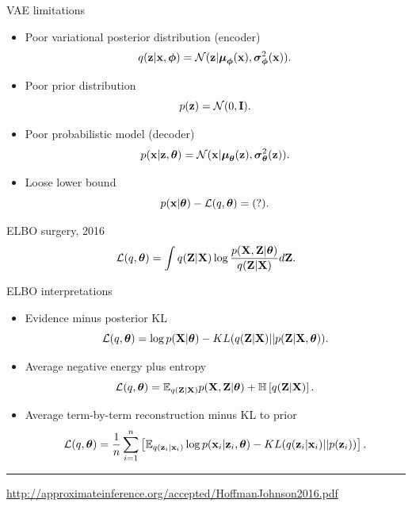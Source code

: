 \begin{frame}{VAE limitations}
\begin{itemize}
	\item Poor variational posterior distribution (encoder)
	\[
		q(\mathbf{z} | \mathbf{x}, \boldsymbol{\phi}) = \mathcal{N}(\mathbf{z}| \boldsymbol{\mu}_{\boldsymbol{\phi}}(\mathbf{x}), \boldsymbol{\sigma}^2_{\boldsymbol{\phi}}(\mathbf{x})).
	\]
	\item Poor prior distribution
	\[
		p(\mathbf{z}) = \mathcal{N}(0, \mathbf{I}).
	\]
	\item Poor probabilistic model (decoder)
	\[
		p(\mathbf{x} | \mathbf{z}, \boldsymbol{\theta}) = \mathcal{N}(\mathbf{x}| \boldsymbol{\mu}_{\boldsymbol{\theta}}(\mathbf{z}), \boldsymbol{\sigma}^2_{\boldsymbol{\theta}}(\mathbf{z})).
	\]
	\item Loose lower bound
	\[
		p(\mathbf{x} | \boldsymbol{\theta}) - \mathcal{L}(q, \boldsymbol{\theta}) = (?).
	\]
\end{itemize}
\end{frame}
\begin{frame}{ELBO surgery, 2016}
		\[
			\mathcal{L} (q, \boldsymbol{\theta})  = \int q(\mathbf{Z} | \mathbf{X}) \log \frac{p(\mathbf{X}, \mathbf{Z} | \boldsymbol{\theta})}{q(\mathbf{Z} | \mathbf{X})} d\mathbf{Z}.
		\]
		\vspace{-0.1cm}
	\begin{block}{ELBO interpretations}
	\begin{itemize}
	    \item Evidence minus posterior KL
	    \vspace{-0.1cm}
	    \[
	        \mathcal{L}(q, \boldsymbol{\theta}) = \log p(\mathbf{X} | \boldsymbol{\theta}) - KL(q(\mathbf{Z} | \mathbf{X}) || p(\mathbf{Z} | \mathbf{X}, \boldsymbol{\theta})).
	    \]
	    \item Average negative energy plus entropy
	    \vspace{-0.1cm}
	    \[
	        \mathcal{L}(q, \boldsymbol{\theta}) = \mathbb{E}_{q(\mathbf{Z} | \mathbf{X})} p(\mathbf{X}, \mathbf{Z} | \boldsymbol{\theta}) + \mathbb{H} \left[q(\mathbf{Z} | \mathbf{X}) \right].
	    \]
	    \item Average term-by-term reconstruction minus KL to prior
	    \vspace{-0.1cm}
	    \[
	        \mathcal{L}(q, \boldsymbol{\theta}) = \frac{1}{n} \sum_{i=1}^n \left[ \mathbb{E}_{q(\mathbf{z}_i | \mathbf{x}_i)} \log p(\mathbf{x}_i | \mathbf{z}_i, \boldsymbol{\theta}) - KL(q(\mathbf{z}_i | \mathbf{x}_i) || p(\mathbf{z}_i)) \right].
	    \]
	\end{itemize}
	\end{block}
	
	\vfill
	\hrule\medskip
	{\scriptsize \href{http://approximateinference.org/accepted/HoffmanJohnson2016.pdf}{http://approximateinference.org/accepted/HoffmanJohnson2016.pdf}}
\end{frame}
